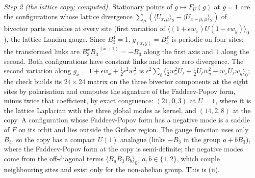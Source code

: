 \emph{Step 2 (the lattice copy; computed).} Stationary points of $g \mapsto F_{U}(g)$ at $g = 1$ are the configurations whose lattice divergence $\sum_{\mu}(\langle U_{x,\mu}\rangle_{2} - \langle U_{x - \mu,\mu}\rangle_{2})$ of bivector parts vanishes at every site (first variation of $\langle(1 + \epsilon w_{x})U(1 - \epsilon w_{y})\rangle_{0}$), the lattice Landau gauge. Since $B_{3}^{4} = 1$, $g_{(x,y)} = B_{3}^{x}$ is periodic on four sites; the transformed links are $B_{3}^{x}B_{3}^{-(x+1)} = -B_{3}$ along the first axis and $1$ along the second. Both configurations have constant links and hence zero divergence. The second variation along $g_{x} = 1 + \epsilon w_{x} + \tfrac12\epsilon^{2}w_{x}^{2}$ is $\epsilon^{2}\sum_{\ell}\langle\tfrac12w_{x}^{2}U_{\ell} + \tfrac12U_{\ell}w_{y}^{2} - w_{x}U_{\ell}w_{y}\rangle_{0}$; the check builds its $24 \times 24$ matrix on the three bivector components at the eight sites by polarisation and computes the signature of the Faddeev-Popov form, minus twice that coefficient, by exact congruence: $(21, 0, 3)$ at $U = 1$, where it is the lattice Laplacian with the three global modes as kernel, and $(14, 2, 8)$ at the copy. A configuration whose Faddeev-Popov form has a negative mode is a saddle of $F$ on its orbit and lies outside the Gribov region. The gauge function uses only $B_{3}$, so the copy has a compact $U(1)$ analogue (links $-B_{3}$ in the group $a + bB_{3}$), where the Faddeev-Popov form at the copy is semi-definite; the negative modes come from the off-diagonal terms $\langle B_{a}B_{3}B_{b}\rangle_{0}$, $a, b \in \{1, 2\}$, which couple neighbouring sites and exist only for the non-abelian group. This is (ii).

